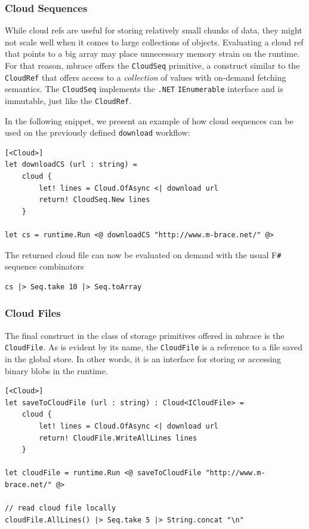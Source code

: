 \documentclass[9pt,a4paper]{article}
\newcommand{\mbrace}{mbrace}
\newcommand{\fsharp}{F\texttt \#}
\newcommand{\dotnet}{\texttt{\hbox{.}NET}}
\begin{document}
\subsubsection*{Cloud Sequences}

While cloud refs are useful for storing relatively small chunks of data,
they might not scale well when it comes to large collections of objects.
Evaluating a cloud ref that points to a big array may place
unnecessary memory strain on the runtime. For that reason,
\mbrace{} offers the \texttt{CloudSeq} primitive, 
a construct similar to the \texttt{CloudRef} that offers access to
a \emph{collection} of values with on-demand fetching semantics.
The \texttt{CloudSeq} implements the \dotnet{} \texttt{IEnumerable} interface 
and is immutable, just like the \texttt{CloudRef}.

In the following snippet, we present an example of how cloud sequences can be
used on the previously defined \texttt{download} workflow:
\begin{lstlisting}
[<Cloud>]
let downloadCS (url : string) =
    cloud {
        let! lines = Cloud.OfAsync <| download url
        return! CloudSeq.New lines
    }
    
let cs = runtime.Run <@ downloadCS "http://www.m-brace.net/" @>
\end{lstlisting}
The returned cloud file can now be evaluated on demand with the usual \fsharp{} 
sequence combinators
\begin{lstlisting}
cs |> Seq.take 10 |> Seq.toArray
\end{lstlisting}

\subsubsection*{Cloud Files}

The final construct in the class of storage primitives offered in \mbrace{}
is the \texttt{CloudFile}. As is evident by its name, the \texttt{CloudFile}
is a reference to a file saved in the global store. In other words, it is an
interface for storing or accessing binary blobs in the runtime.
\begin{lstlisting}
[<Cloud>]
let saveToCloudFile (url : string) : Cloud<ICloudFile> =
    cloud {
        let! lines = Cloud.OfAsync <| download url
        return! CloudFile.WriteAllLines lines
    }
    
let cloudFile = runtime.Run <@ saveToCloudFile "http://www.m-brace.net/" @>

// read cloud file locally
cloudFile.AllLines() |> Seq.take 5 |> String.concat "\n"
\end{lstlisting}
\end{document}
